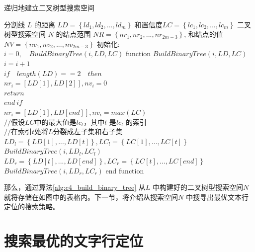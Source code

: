     \begin{algorithm}[!h]
	\renewcommand{\algorithmicrequire}{\textbf{输入:}}
	\renewcommand{\algorithmicensure}{\textbf{输出:}}
	\caption{递归地建立二叉树型搜索空间}
	\label{alg:c4_build_binary_tree}
	\begin{algorithmic}[1]
		\REQUIRE 分割线 $L$ 的距离 $LD=\left\{ld_1,ld_2,...,ld_m\right\}$ 和置信度$LC=\left\{lc_1,lc_2,...,lc_m\right\}$
		\ENSURE 二叉树型搜索空间 $N$ 的结点范围 $NR=\left\{nr_1,nr_2,...,nr_{2m-3}\right\}$, 和结点的值 $NV=\left\{nv_1,nv_2,...,nv_{2m-3}\right\}$
      \STATE 初始化: \\
      \STATE \quad $i=0, \quad BuildBinaryTree(i,LD,LC)$
      \STATE function $BuildBinaryTree(i,LD,LC)$
        \\\STATE \quad $i=i+1$
        \\\STATE \quad $if \quad length(LD)==2 \quad then$
        \\\STATE \qquad $nr_{i}=[LD[1],LD[2]], nv_{i}=0$
        \\\STATE \qquad $return$
        \\\STATE \quad $end \ if$
        \\\STATE \quad $nr_{i}=[LD[1],LD[end]], nv_{i}=max(LC)$
        \\\STATE \quad $//$假设$LC$中的最大值是$lc_t$，其中$t$ 是$lc_t$ 的索引
        \\\STATE \quad $//$在索引$t$处将$L$分裂成左子集和右子集
        \\\STATE \quad $LD_{l}=\left\{LD[1],...,LD[t]\right\}, LC_{l}=\left\{LC[1],...,LC[t]\right\}$
        \\\STATE \quad $BuildBinaryTree(i,LD_{l},LC_{l})$
        \\\STATE \quad $LD_{r}=\left\{LD[t],...,LD[end]\right\}, LC_{r}=\left\{LC[t],...,LC[end]\right\}$
        \\\STATE \quad $BuildBinaryTree(i,LD_{r},LC_{r})$
      \STATE end function
	\end{algorithmic}
    \end{algorithm}

    那么，通过算法\ref{alg:c4_build_binary_tree} 从$L$ 中构建好的二叉树型搜索空间$N$就将存储在如图中的表格内。下一节，将介绍从搜索空间$N$ 中搜寻出最优文本行定位的搜索策略。

    \section{搜索最优的文字行定位}

